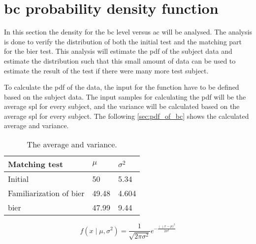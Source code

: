 \section{\gls{bc} probability density function}
In this section the density for the \gls{bc} level versus \gls{ac} will be analysed. The analysis is done to verify the distribution of both the initial test and the matching part for the \gls{bier} test. This analysis will estimate the \gls{pdf} of the subject data and estimate the distribution such that this small amount of data can be used to estimate the result of the test if there were many more test subject. 

To calculate the \gls{pdf} of the data, the input for the function have to be defined based on the subject data. The input samples for calculating the  \gls{pdf} will be the average \gls{spl} for every subject, and the variance will be calculated based on the average \gls{spl} for every subject. The following \autoref{sec:pdf_of_bc} shows the calculated average and variance.

\begin{table}[H]
\centering
\caption{The average and variance.}
\begin{tabular}{l|ll}
Matching test                 & $\mu$ & $\sigma^2$ \\ \hline
Initial                       & 50    & 5.34       \\
Familiarization of \gls{bier} & 49.48 & 4.604      \\
\gls{bier}                    & 47.99 & 9.44      
\end{tabular}
\label{sec:pdf_of_bc}
\end{table}


\begin{equation}
f(x \mid \mu, \sigma^2) = \frac{1}{\sqrt{2 \pi \sigma^2}}e^{-\frac{()x-\mu)^2}{2\sigma^2}}
\end{equation}